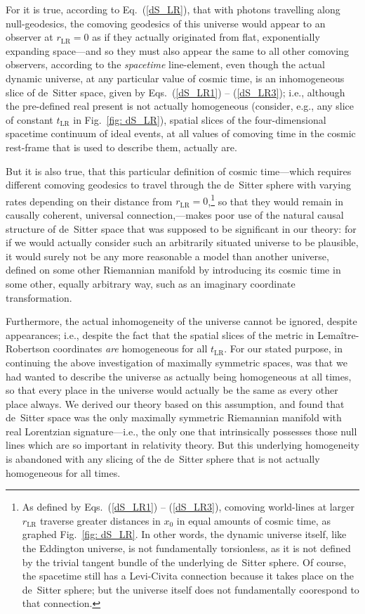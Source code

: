 For it is true, according to Eq.~(\ref{dS_LR}), that with photons travelling along null-geodesics, the comoving geodesics of this universe would appear to an observer at $r_{\mathrm{LR}}=0$ as if they actually originated from flat, exponentially expanding space---and so they must also appear the same to all other comoving observers, according to the \textit{spacetime} line-element, even though the actual dynamic universe, at any particular value of cosmic time, is an inhomogeneous slice of de~Sitter space, given by Eqs.~(\ref{dS_LR1}) -- (\ref{dS_LR3}); i.e., although the pre-defined real present is not actually homogeneous (consider, e.g., any slice of constant $t_{\mathrm{LR}}$ in Fig.~\ref{fig: dS_LR}), spatial slices of the four-dimensional spacetime continuum of ideal events, at all values of comoving time in the cosmic rest-frame that is used to describe them, actually are. 

But it is also true, that this particular definition of cosmic time---which requires different comoving geodesics to travel through the de~Sitter sphere with varying rates depending on their distance from $r_{\mathrm{LR}}=0$,\footnote{As defined by Eqs.~(\ref{dS_LR1}) -- (\ref{dS_LR3}), comoving world-lines at larger $r_{\mathrm{LR}}$ traverse greater distances in $x_0$ in equal amounts of cosmic time, as graphed Fig.~\ref{fig: dS_LR}. In other words, the dynamic universe itself, like the Eddington universe, is not fundamentally torsionless, as it is not defined by the trivial tangent bundle of the underlying de~Sitter sphere. Of course, the spacetime still has a Levi-Civita connection because it takes place on the de~Sitter sphere; but the universe itself does not fundamentally coorespond to that connection.} so that they would remain in causally coherent, universal connection,---makes poor use of the natural causal structure of de~Sitter space that was supposed to be significant in our theory: for if we would actually consider such an arbitrarily situated universe to be plausible, it would surely not be any more reasonable a model than another universe, defined on some other Riemannian manifold by introducing its cosmic time in some other, equally arbitrary way, such as an imaginary coordinate transformation.

Furthermore, the actual inhomogeneity of the universe cannot be ignored, despite appearances; i.e., despite the fact that the spatial slices of the metric in Lema\^{i}tre-Robertson coordinates \textit{are} homogeneous for all $t_{\mathrm{LR}}$. For our stated purpose, in continuing the above investigation of maximally symmetric spaces, was that we had wanted to describe the universe as actually being homogeneous at all times, so that every place in the universe would actually be the same as every other place always. We derived our theory based on this assumption, and found that de~Sitter space was the only maximally symmetric Riemannian manifold with real Lorentzian signature---i.e., the only one that intrinsically possesses those null lines which are so important in relativity theory. But this underlying homogeneity is abandoned with any slicing of the de~Sitter sphere that is not actually homogeneous for all times.

